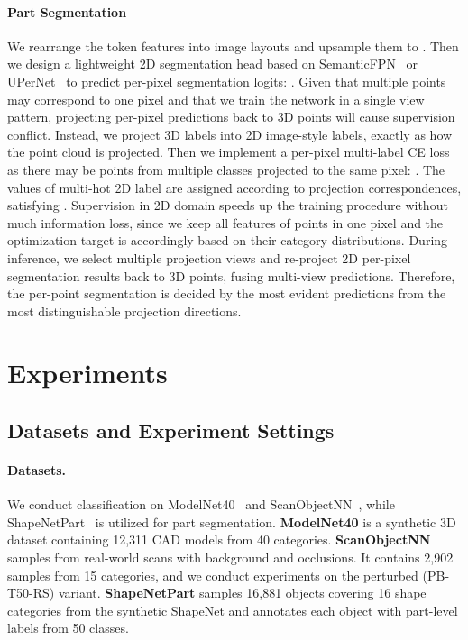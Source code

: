 \documentclass{article}
\begin{document}
\paragraph{Part Segmentation}

We rearrange the token features  into image layouts and upsample them to . Then we design a lightweight 2D segmentation head  based on SemanticFPN~\cite{kirillov2019semanticfpn} or UPerNet~\cite{xiao2018uper} to predict per-pixel segmentation logits: . 
Given that multiple points may correspond to one pixel and that we train the network in a single view pattern, projecting per-pixel predictions back to 3D points will cause supervision conflict. Instead, we project 3D labels into 2D image-style labels, exactly as how the point cloud is projected. Then we implement a per-pixel multi-label CE loss as there may be points from multiple classes projected to the same pixel: . The values of multi-hot 2D label  are assigned according to projection correspondences, satisfying . Supervision in 2D domain speeds up the training procedure without much information loss, since we keep all features of points in one pixel and the optimization target is accordingly based on their category distributions. During inference, we select multiple projection views and re-project 2D per-pixel segmentation results back to 3D points, fusing multi-view predictions. Therefore, the per-point segmentation is decided by the most evident predictions from the most distinguishable projection directions.


\section{Experiments}

\subsection{Datasets and Experiment Settings}
\label{sec:exp_setting}

\paragraph{Datasets.} We conduct classification on ModelNet40~\cite{wu2015modelnet} and ScanObjectNN~\cite{uy2019scanobjectnn}, while ShapeNetPart~\cite{uy2019scanobjectnn} is utilized for part segmentation. 
\textbf{ModelNet40} is a synthetic 3D dataset containing 12,311 CAD models from 40 categories. 
\textbf{ScanObjectNN} samples from real-world scans with background and occlusions. It contains 2,902 samples from 15 categories, and we conduct experiments on the perturbed (PB-T50-RS) variant. 
\textbf{ShapeNetPart} samples 16,881 objects covering 16 shape categories from the synthetic ShapeNet and annotates each object with part-level labels from 50 classes. 
\end{document}
